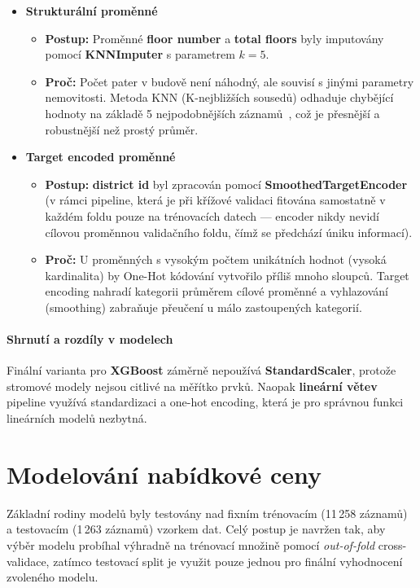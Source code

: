 \begin{itemize}
    \item \textbf{Strukturální proměnné}
    \begin{itemize}
        \item \textbf{Postup:} Proměnné \textbf{floor number} a \textbf{total floors} byly imputovány pomocí \textbf{KNNImputer} s parametrem $k = 5$.
        \item \textbf{Proč:} Počet pater v budově není náhodný, ale souvisí s jinými parametry nemovitosti. Metoda KNN (K-nejbližších sousedů) odhaduje chybějící hodnoty na základě 5 nejpodobnějších záznamů~\cite{Troyanskaya2001KNNImpute}, což je přesnější a robustnější než prostý průměr.
    \end{itemize}

    \item \textbf{Target encoded proměnné}
    \begin{itemize}
        \item \textbf{Postup:} \textbf{district id} byl zpracován pomocí \textbf{SmoothedTargetEncoder} (v rámci pipeline, která je při křížové validaci fitována samostatně v každém foldu pouze na trénovacích datech — encoder nikdy nevidí cílovou proměnnou validačního foldu, čímž se předchází úniku informací).
        \item \textbf{Proč:} U proměnných s vysokým počtem unikátních hodnot (vysoká kardinalita) by One-Hot kódování vytvořilo příliš mnoho sloupců. Target encoding nahradí kategorii průměrem cílové proměnné a vyhlazování (smoothing) zabraňuje přeučení u málo zastoupených kategorií.
    \end{itemize}
\end{itemize}

\subsubsection*{Shrnutí a rozdíly v modelech}
Finální varianta pro \textbf{XGBoost} záměrně nepoužívá \textbf{StandardScaler}, protože stromové modely nejsou citlivé na měřítko prvků. Naopak \textbf{lineární větev} pipeline využívá standardizaci a one-hot encoding, která je pro správnou funkci lineárních modelů nezbytná.
\newpage{}
\chapter{Modelování nabídkové ceny} \label{chap:implementation}

Základní rodiny modelů byly testovány nad fixním trénovacím (11\,258 záznamů) a testovacím (1\,263 záznamů) vzorkem dat. Celý postup je navržen tak, aby výběr modelu probíhal výhradně na trénovací množině pomocí \textit{out-of-fold} cross-validace, zatímco testovací split je využit pouze jednou pro finální vyhodnocení zvoleného modelu.

